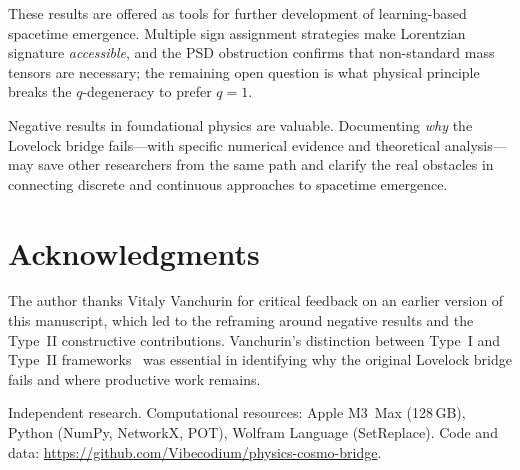 \documentclass[11pt]{article}
\theoremstyle{definition}
\theoremstyle{remark}
\begin{document}
These results are offered as tools for further development of
learning-based spacetime emergence.
Multiple sign assignment strategies make Lorentzian signature
\emph{accessible}, and the PSD obstruction confirms that non-standard
mass tensors are necessary; the remaining open question is what
physical principle breaks the $q$-degeneracy to prefer $q = 1$.

Negative results in foundational physics are valuable.
Documenting \emph{why} the Lovelock bridge fails---with specific
numerical evidence and theoretical analysis---may save other
researchers from the same path and clarify the real obstacles in
connecting discrete and continuous approaches to spacetime emergence.

\section*{Acknowledgments}

The author thanks Vitaly Vanchurin for critical feedback on an earlier
version of this manuscript, which led to the reframing around
negative results and the Type~II constructive contributions.
Vanchurin's distinction between Type~I and Type~II
frameworks~\cite{Vanchurin2025} was essential in identifying why the
original Lovelock bridge fails and where productive work remains.

Independent research.
Computational resources: Apple M3~Max (128\,GB), Python (NumPy,
NetworkX, POT), Wolfram Language (SetReplace).
Code and data: \url{https://github.com/Vibecodium/physics-cosmo-bridge}.



\end{document}
